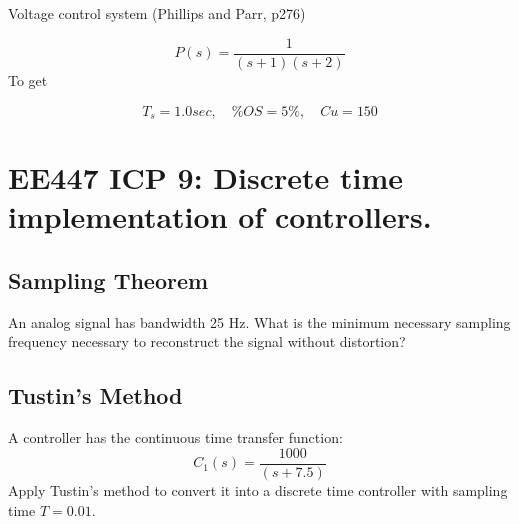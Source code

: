 \documentclass{article}	%
\begin{document}
\subsection{}
Voltage control system (Phillips and Parr, p276)

\[
P(s) =  \frac {1}{(s+1)(s+2)}
\]
To get

\[
T_s =  1.0 sec, \quad \%OS = 5\%, \quad Cu = 150
\]
%
%
%
%
%
%


\newpage
\section{EE447 ICP 9: Discrete time implementation of controllers.}


\subsection{Sampling Theorem }


An analog signal has bandwidth 25 Hz.   What is the minimum necessary sampling frequency necessary to reconstruct the signal without distortion?


%

\subsection{Tustin's Method}


A controller has the continuous time transfer function:
\[
C_1(s) = \frac{1000}{(s+7.5)}
\]
Apply Tustin's method to convert it into a discrete time controller with sampling time $T=0.01$.


%
\end{document}
